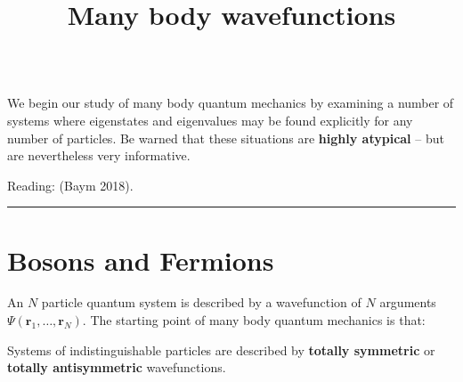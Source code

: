\documentclass[
  a4paper,
]{scrbook}
\title{Many body wavefunctions}
\author{}
\date{}
\begin{document}
\frontmatter
\maketitle


\mainmatter
\newcommand{\cN}{\mathcal{N}}
\newcommand{\br}{\mathbf{r}}
\newcommand{\bp}{\mathbf{p}}
\newcommand{\bk}{\mathbf{k}}
\newcommand{\bq}{\mathbf{q}}
\newcommand{\bv}{\mathbf{v}}
\newcommand{\brN}{\br_1, \ldots, \br_N}
\newcommand{\xN}{x_1, \ldots, x_N}
\newcommand{\zN}{z_1, \ldots, z_N}
\newcommand{\pop}{\psi^{\vphantom{\dagger}}}
\newcommand{\pdop}{\psi^\dagger}
\newcommand{\Pop}{\Psi^{\vphantom{\dagger}}}
\newcommand{\Pdop}{\Psi^\dagger}
\newcommand{\Phop}{\Phi^{\vphantom{\dagger}}}
\newcommand{\Phdop}{\Phi^\dagger}
\newcommand{\phop}{\phi^{\vphantom{\dagger}}}
\newcommand{\phdop}{\phi^\dagger}
\newcommand{\aop}{a^{\vphantom{\dagger}}}
\newcommand{\adop}{a^\dagger}
\newcommand{\bop}{b^{\vphantom{\dagger}}}
\newcommand{\bdop}{b^\dagger}
\newcommand{\cop}{c^{\vphantom{\dagger}}}
\newcommand{\cdop}{c^\dagger}
\newcommand{\bra}[1]{\langle{#1}\rvert}
\newcommand{\ket}[1]{\lvert{#1}\rangle}
\newcommand{\inner}[2]{\langle{#1}\rvert #2 \rangle}
\newcommand{\braket}[3]{\langle{#1}\rvert #2 \lvert #3 \rangle}
\newcommand{\sgn}{\mathrm{sgn}}
\newcommand{\abs}[1]{\lvert{#1}\rvert}

\[
\DeclareMathOperator{\tr}{tr}
\DeclareMathOperator{\E}{\mathbb{E}}
\]

We begin our study of many body quantum mechanics by examining a number
of systems where eigenstates and eigenvalues may be found explicitly for
any number of particles. Be warned that these situations are
\textbf{highly atypical} -- but are nevertheless very informative.

Reading: (Baym 2018).

\begin{center}\rule{0.5\linewidth}{0.5pt}\end{center}

\chapter{Bosons and Fermions}\label{bosons-and-fermions}

An \(N\) particle quantum system is described by a wavefunction of \(N\)
arguments \(\Psi(\mathbf{r}_1,\ldots, \mathbf{r}_N)\). The starting
point of many body quantum mechanics is that:

\begin{tcolorbox}[enhanced jigsaw, rightrule=.15mm, colback=white, opacityback=0, left=2mm, toprule=.15mm, breakable, leftrule=.75mm, colframe=quarto-callout-warning-color-frame, arc=.35mm, bottomrule=.15mm]

Systems of indistinguishable particles are described by \textbf{totally
symmetric} or \textbf{totally antisymmetric} wavefunctions.

\end{tcolorbox}
\end{document}
